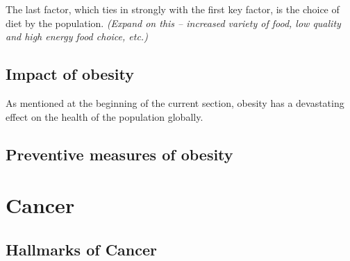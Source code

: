 \noindent
The last factor, which ties in strongly with the first key factor, is the choice of diet by the population.
\textit{(Expand on this -- increased variety of food, low quality and high energy food choice, etc.)}

\citep{Malik2013}


\subsection{Impact of obesity}
\label{sub:impact_of_obesity}

As mentioned at the beginning of the current section, obesity has a devastating effect on the health of the population globally.


\citep{Malik2013, Franks2010}




\subsection{Preventive measures of obesity}
\label{sub:preventive_measures_of_obesity}

\citep{Malik2013}




\section{Cancer}
\label{sec:cancer}


\subsection{Hallmarks of Cancer}
\label{subsec:cancerhallmarks}



